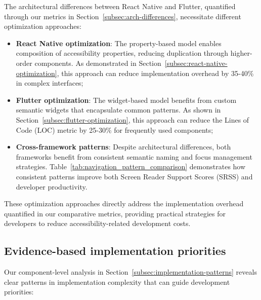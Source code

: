 The architectural differences between React Native and Flutter, quantified through our metrics in Section~\ref{subsec:arch-differences}, necessitate different optimization approaches:

\begin{itemize}
    \item \textbf{React Native optimization}: The property-based model enables composition of accessibility properties, reducing duplication through higher-order components. As demonstrated in Section~\ref{subsec:react-native-optimization}, this approach can reduce implementation overhead by 35-40\% in complex interfaces;

    \item \textbf{Flutter optimization}: The widget-based model benefits from custom semantic widgets that encapsulate common patterns. As shown in Section~\ref{subsec:flutter-optimization}, this approach can reduce the Lines of Code (LOC) metric by 25-30\% for frequently used components;

    \item \textbf{Cross-framework patterns}: Despite architectural differences, both frameworks benefit from consistent semantic naming and focus management strategies. Table~\ref{tab:navigation_pattern_comparison} demonstrates how consistent patterns improve both Screen Reader Support Scores (SRSS) and developer productivity.
\end{itemize}

These optimization approaches directly address the implementation overhead quantified in our comparative metrics, providing practical strategies for developers to reduce accessibility-related development costs.

\subsection{Evidence-based implementation priorities}
\label{subsec:implications-priorities}

Our component-level analysis in Section~\ref{subsec:implementation-patterns} reveals clear patterns in implementation complexity that can guide development priorities:

